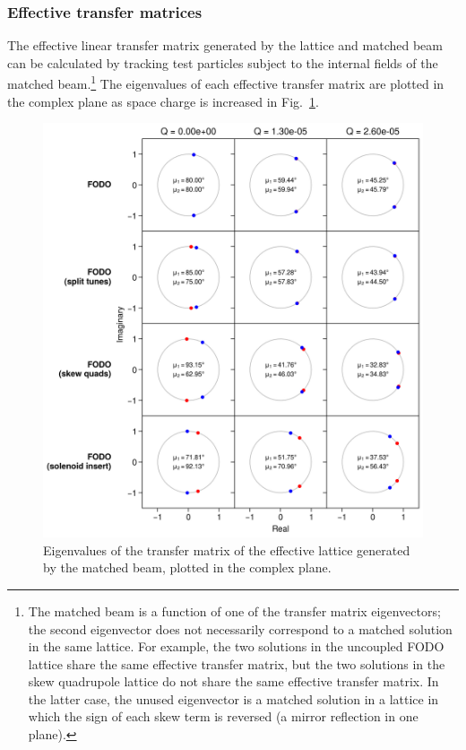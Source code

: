 \subsubsection{Effective transfer matrices}

The effective linear transfer matrix generated by the lattice and matched beam can be calculated by tracking test particles subject to the internal fields of the matched beam.\footnote{The matched beam is a function of one of the transfer matrix eigenvectors; the second eigenvector does not necessarily correspond to a matched solution in the same lattice. For example, the two solutions in the uncoupled FODO lattice share the same effective transfer matrix, but the two solutions in the skew quadrupole lattice do not share the same effective transfer matrix. In the latter case, the unused eigenvector is a matched solution in a lattice in which the sign of each skew term is reversed (a mirror reflection in one plane).} The eigenvalues of each effective transfer matrix are plotted in the complex plane as space charge is increased in Fig.~\ref{fig:effective_transfer_matrix_eigvals}.
%
\begin{figure}[!p]
    \centering
    \includegraphics[width=\textwidth]{Images/chapter2/eigvals.png}
    \caption{Eigenvalues of the transfer matrix of the effective lattice generated by the matched beam, plotted in the complex plane.}
    \label{fig:effective_transfer_matrix_eigvals}
\end{figure}

